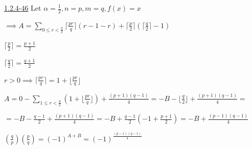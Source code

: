 \documentclass{article}
\begin{document}
\href{./1.2.4-46.pdf}{1.2.4\mbox{-}46} Let \( \alpha = \frac{1}{2}, n = p, m = q, f(x) = x \)

\( \implies A = \sum_{0 \leq r < \frac{q}{2}}{\lceil\frac{pr}{q}\rceil} (r - 1 -r) + \lceil{\frac{p}{2}}\rceil(\lceil{\frac{q}{2}}\rceil - 1) \)

\( \lceil{\frac{p}{2}}\rceil = \frac{p+1}{2} \)

\( \lceil{\frac{q}{2}}\rceil = \frac{q+1}{2} \)

\( r > 0 \implies \lceil\frac{pr}{q}\rceil = 1 + \lfloor\frac{pr}{q}\rfloor \)

\( A = 0 - \sum_{1\leq r < \frac{q}{2}} (1 + \lfloor\frac{pr}{q}\rfloor) + \frac{(p+1)(q-1)}{4} = -B - \lfloor{\frac{q}{2}}\rfloor + \frac{(p+1)(q-1)}{4} = \)

\( = -B - \frac{q-1}{2} + \frac{(p+1)(q-1)}{4} = -B + \frac{q-1}{2}(-1 + \frac{p+1}{2}) = - B + \frac{(p-1)(q-1)}{4} \)

\( (\frac{q}{p})(\frac{p}{q}) = {(-1)}^{A+B} = {(-1)}^{\frac{(p-1)(q-1)}{4}} \)
\end{document}
